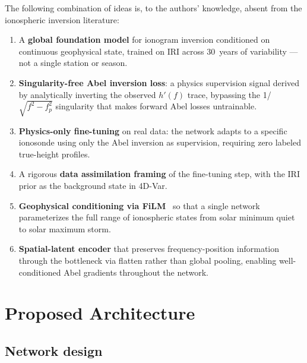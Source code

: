 \documentclass[11pt,twocolumn]{article}
\begin{document}
\begin{mdframed}[backgroundcolor=boxbg, linecolor=boxborder, linewidth=1pt,
                 innertopmargin=5pt, innerbottommargin=5pt,
                 innerleftmargin=8pt, innerrightmargin=8pt]
The following combination of ideas is, to the authors' knowledge, absent from
the ionospheric inversion literature:
\begin{enumerate}[leftmargin=1.2em, itemsep=2pt, topsep=2pt]
  \item A \textbf{global foundation model} for ionogram inversion conditioned on
        continuous geophysical state, trained on IRI across 30~years of
        variability --- not a single station or season.
  \item \textbf{Singularity-free Abel inversion loss}: a physics supervision
        signal derived by analytically inverting the observed $h'(f)$ trace,
        bypassing the 1/$\sqrt{f^2-f_p^2}$ singularity that makes forward Abel
        losses untrainable.
  \item \textbf{Physics-only fine-tuning} on real data: the network adapts to a
        specific ionosonde using only the Abel inversion as supervision,
        requiring zero labeled true-height profiles.
  \item A rigorous \textbf{data assimilation framing} of the fine-tuning step,
        with the IRI prior as the background state in 4D-Var.
  \item \textbf{Geophysical conditioning via FiLM}~\citep{perez2018} so that a
        single network parameterizes the full range of ionospheric states from
        solar minimum quiet to solar maximum storm.
  \item \textbf{Spatial-latent encoder} that preserves frequency-position
        information through the bottleneck via flatten rather than global
        pooling, enabling well-conditioned Abel gradients throughout the network.
\end{enumerate}
\end{mdframed}

\section{Proposed Architecture}

\subsection{Network design}
\end{document}
